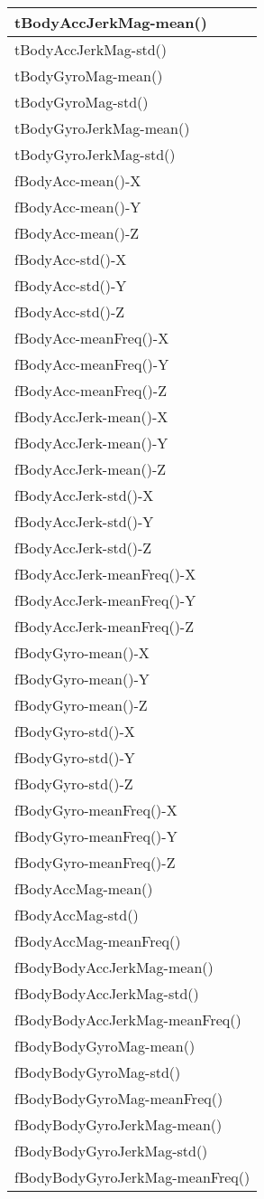 \documentclass[
]{article}
\begin{document}
\begin{table}
\begin{tabular}[t]{l}
tBodyAccJerkMag-mean()\\
\hline
tBodyAccJerkMag-std()\\
\hline
tBodyGyroMag-mean()\\
\hline
tBodyGyroMag-std()\\
\hline
tBodyGyroJerkMag-mean()\\
\hline
tBodyGyroJerkMag-std()\\
\hline
fBodyAcc-mean()-X\\
\hline
fBodyAcc-mean()-Y\\
\hline
fBodyAcc-mean()-Z\\
\hline
fBodyAcc-std()-X\\
\hline
fBodyAcc-std()-Y\\
\hline
fBodyAcc-std()-Z\\
\hline
fBodyAcc-meanFreq()-X\\
\hline
fBodyAcc-meanFreq()-Y\\
\hline
fBodyAcc-meanFreq()-Z\\
\hline
fBodyAccJerk-mean()-X\\
\hline
fBodyAccJerk-mean()-Y\\
\hline
fBodyAccJerk-mean()-Z\\
\hline
fBodyAccJerk-std()-X\\
\hline
fBodyAccJerk-std()-Y\\
\hline
fBodyAccJerk-std()-Z\\
\hline
fBodyAccJerk-meanFreq()-X\\
\hline
fBodyAccJerk-meanFreq()-Y\\
\hline
fBodyAccJerk-meanFreq()-Z\\
\hline
fBodyGyro-mean()-X\\
\hline
fBodyGyro-mean()-Y\\
\hline
fBodyGyro-mean()-Z\\
\hline
fBodyGyro-std()-X\\
\hline
fBodyGyro-std()-Y\\
\hline
fBodyGyro-std()-Z\\
\hline
fBodyGyro-meanFreq()-X\\
\hline
fBodyGyro-meanFreq()-Y\\
\hline
fBodyGyro-meanFreq()-Z\\
\hline
fBodyAccMag-mean()\\
\hline
fBodyAccMag-std()\\
\hline
fBodyAccMag-meanFreq()\\
\hline
fBodyBodyAccJerkMag-mean()\\
\hline
fBodyBodyAccJerkMag-std()\\
\hline
fBodyBodyAccJerkMag-meanFreq()\\
\hline
fBodyBodyGyroMag-mean()\\
\hline
fBodyBodyGyroMag-std()\\
\hline
fBodyBodyGyroMag-meanFreq()\\
\hline
fBodyBodyGyroJerkMag-mean()\\
\hline
fBodyBodyGyroJerkMag-std()\\
\hline
fBodyBodyGyroJerkMag-meanFreq()\\
\hline
\end{tabular}
\end{table}
\end{document}
